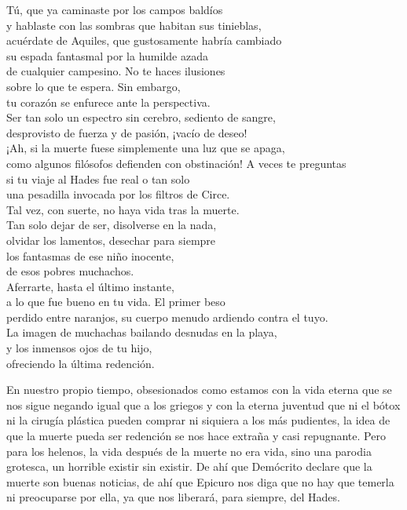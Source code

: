 \begin{versopropio}
Tú, que ya caminaste por los campos baldíos\\
y hablaste con las sombras que habitan sus tinieblas,\\
acuérdate de Aquiles, que gustosamente habría cambiado\\
su espada fantasmal por la humilde azada\\
de cualquier campesino. No te haces ilusiones\\
sobre lo que te espera. Sin embargo,\\
tu corazón se enfurece ante la perspectiva.\\
Ser tan solo un espectro sin cerebro, sediento de sangre,\\
desprovisto de fuerza y de pasión, ¡vacío de deseo!\\
¡Ah, si la muerte fuese simplemente una luz que se apaga,\\
como algunos filósofos defienden con obstinación!
\stanzabreak
A veces te preguntas\\
si tu viaje al Hades fue real o tan solo\\
una pesadilla invocada por los filtros de Circe.\\
Tal vez, con suerte, no haya vida tras la muerte.\\
Tan solo dejar de ser, disolverse en la nada,\\
olvidar los lamentos, desechar para siempre\\
los fantasmas de ese niño inocente,\\
de esos pobres muchachos.\\
Aferrarte, hasta el último instante,\\
a lo que fue bueno en tu vida. El primer beso\\
perdido entre naranjos, su cuerpo menudo ardiendo contra el tuyo.\\
La imagen de muchachas bailando desnudas en la playa,\\
y los inmensos ojos de tu hijo,\\
ofreciendo la última redención.
\end{versopropio}

En nuestro propio tiempo, obsesionados como estamos con la vida eterna que se nos sigue negando igual que a los griegos y con la eterna juventud que ni el bótox ni la cirugía plástica pueden comprar ni siquiera a los más pudientes, la idea de que la muerte pueda ser redención se nos hace extraña y casi repugnante. Pero para los helenos, la vida después de la muerte no era vida, sino una parodia grotesca, un horrible existir sin existir. De ahí que Demócrito declare que la muerte son buenas noticias, de ahí que Epicuro nos diga que no hay que temerla ni preocuparse por ella, ya que nos liberará, para siempre, del Hades.
